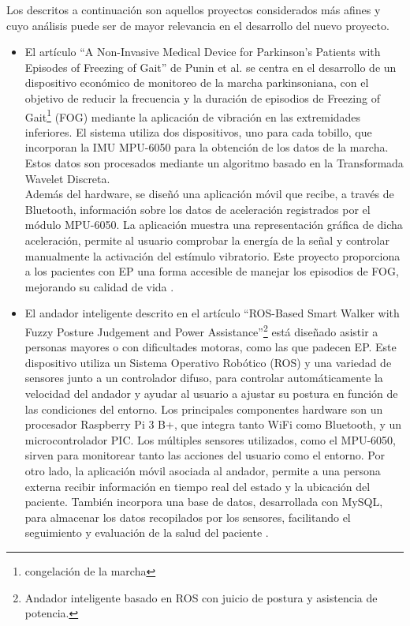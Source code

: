 Los descritos a continuación son aquellos proyectos considerados más afines y cuyo análisis puede ser de mayor relevancia en el desarrollo del nuevo proyecto.
\begin{itemize}
    \item El artículo ``A Non-Invasive Medical Device for Parkinson's Patients with Episodes of Freezing of Gait'' de Punin et al. se centra en el desarrollo de un dispositivo económico de monitoreo de la marcha parkinsoniana, con el objetivo de reducir la frecuencia y la duración de episodios de Freezing of Gait\footnote{congelación de la marcha} (FOG) mediante la aplicación de vibración en las extremidades inferiores. El sistema utiliza dos dispositivos, uno para cada tobillo, que incorporan la IMU MPU-6050 para la obtención de los datos de la marcha. Estos datos son procesados mediante un algoritmo basado en la Transformada Wavelet Discreta. \\
    Además del hardware, se diseñó una aplicación móvil que recibe, a través de Bluetooth, información sobre los datos de aceleración registrados por el módulo MPU-6050. La aplicación muestra una representación gráfica de dicha aceleración, permite al usuario comprobar la energía de la señal y controlar manualmente la activación del estímulo vibratorio. Este proyecto proporciona a los pacientes con EP una forma accesible de manejar los episodios de FOG, mejorando su calidad de vida \cite{punin2019noninvasive}.
    
    \item El andador inteligente descrito en el artículo ``ROS-Based Smart Walker with Fuzzy Posture Judgement and Power Assistance''\footnote{Andador inteligente basado en ROS con juicio de postura y asistencia de potencia.} está diseñado asistir a personas mayores o con dificultades motoras, como las que padecen EP. Este dispositivo utiliza un Sistema Operativo Robótico (ROS) y una variedad de sensores junto a un controlador difuso, para controlar automáticamente la velocidad del andador y ayudar al usuario a ajustar su postura en función de las condiciones del entorno. Los principales componentes hardware son un procesador Raspberry Pi 3 B+, que integra tanto WiFi como Bluetooth, y un microcontrolador PIC. Los múltiples sensores utilizados, como el MPU-6050, sirven para monitorear tanto las acciones del usuario como el entorno. Por otro lado, la aplicación móvil asociada al andador, permite a una persona externa recibir información en tiempo real del estado y la ubicación del paciente. También incorpora una base de datos, desarrollada con MySQL, para almacenar los datos recopilados por los sensores, facilitando el seguimiento y evaluación de la salud del paciente \cite{andador}.
    

\end{itemize}
